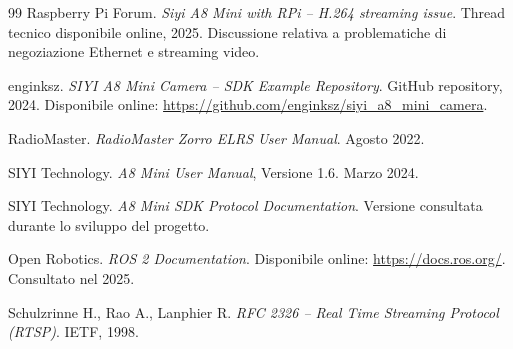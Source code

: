 \begin{thebibliography}{99}
Raspberry Pi Forum.  
\textit{Siyi A8 Mini with RPi – H.264 streaming issue}.  
Thread tecnico disponibile online, 2025.  
Discussione relativa a problematiche di negoziazione Ethernet e streaming video.

enginksz.  
\textit{SIYI A8 Mini Camera – SDK Example Repository}.  
GitHub repository, 2024.  
Disponibile online: \url{https://github.com/enginksz/siyi_a8_mini_camera}.

RadioMaster.  
\textit{RadioMaster Zorro ELRS User Manual}.  
Agosto 2022.

SIYI Technology.  
\textit{A8 Mini User Manual}, Versione 1.6.  
Marzo 2024.

SIYI Technology.  
\textit{A8 Mini SDK Protocol Documentation}.  
Versione consultata durante lo sviluppo del progetto.

Open Robotics.  
\textit{ROS 2 Documentation}.  
Disponibile online: \url{https://docs.ros.org/}.  
Consultato nel 2025.


Schulzrinne H., Rao A., Lanphier R.  
\textit{RFC 2326 – Real Time Streaming Protocol (RTSP)}.  
IETF, 1998.

\end{thebibliography}

